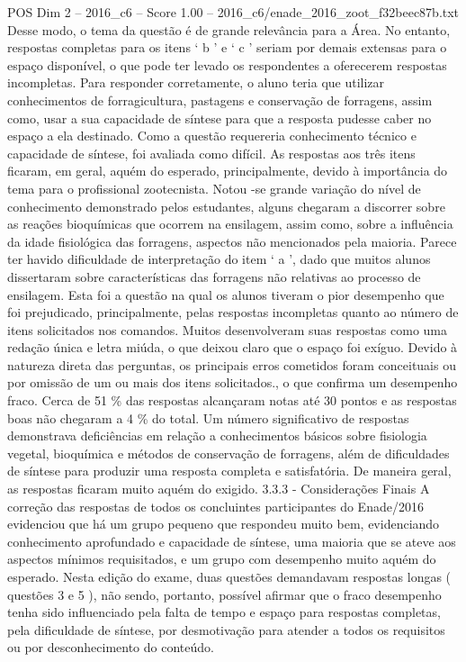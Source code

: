 \begin{textsample}{POS Dim 2 – 2016\_c6 – Score 1.00 – 2016\_c6/enade\_2016\_zoot\_f32beec87b.txt}
Desse modo, o tema da questão é de grande relevância para a Área.
No entanto, respostas completas para os itens ‘ b ’ e ‘ c ’ seriam por demais extensas para o espaço disponível, o que pode ter levado os respondentes a oferecerem respostas incompletas.
Para responder corretamente, o aluno teria que utilizar conhecimentos de forragicultura, pastagens e conservação de forragens, assim como, usar a sua capacidade de síntese para que a resposta pudesse caber no espaço a ela destinado.
Como a questão requereria conhecimento técnico e capacidade de síntese, foi avaliada como difícil.
As respostas aos três itens ficaram, em geral, aquém do esperado, principalmente, devido à importância do tema para o profissional zootecnista.
Notou -se grande variação do nível de conhecimento demonstrado pelos estudantes, alguns chegaram a discorrer sobre as reações bioquímicas que ocorrem na ensilagem, assim como, sobre a influência da idade fisiológica das forragens, aspectos não mencionados pela maioria.
Parece ter havido dificuldade de interpretação do item ‘ a ’, dado que muitos alunos dissertaram sobre características das forragens não relativas ao processo de ensilagem.
Esta foi a questão na qual os alunos tiveram o pior desempenho que foi prejudicado, principalmente, pelas respostas incompletas quanto ao número de itens solicitados nos comandos.
Muitos desenvolveram suas respostas como uma redação única e letra miúda, o que deixou claro que o espaço foi exíguo.
Devido à natureza direta das perguntas, os principais erros cometidos foram conceituais ou por omissão de um ou mais dos itens solicitados., o que confirma um desempenho fraco.
Cerca de 51 \% das respostas alcançaram notas até 30 pontos e as respostas boas não chegaram a 4 \% do total.
Um número significativo de respostas demonstrava deficiências em relação a conhecimentos básicos sobre fisiologia vegetal, bioquímica e métodos de conservação de forragens, além de dificuldades de síntese para produzir uma resposta completa e satisfatória.
De maneira geral, as respostas ficaram muito aquém do exigido. 3.3.3 - Considerações Finais A correção das respostas de todos os concluintes participantes do Enade/2016 evidenciou que há um grupo pequeno que respondeu muito bem, evidenciando conhecimento aprofundado e capacidade de síntese, uma maioria que se ateve aos aspectos mínimos requisitados, e um grupo com desempenho muito aquém do esperado.
Nesta edição do exame, duas questões demandavam respostas longas ( questões 3 e 5 ), não sendo, portanto, possível afirmar que o fraco desempenho tenha sido influenciado pela falta de tempo e espaço para respostas completas, pela dificuldade de síntese, por desmotivação para atender a todos os requisitos ou por desconhecimento do conteúdo.

\end{textsample}
